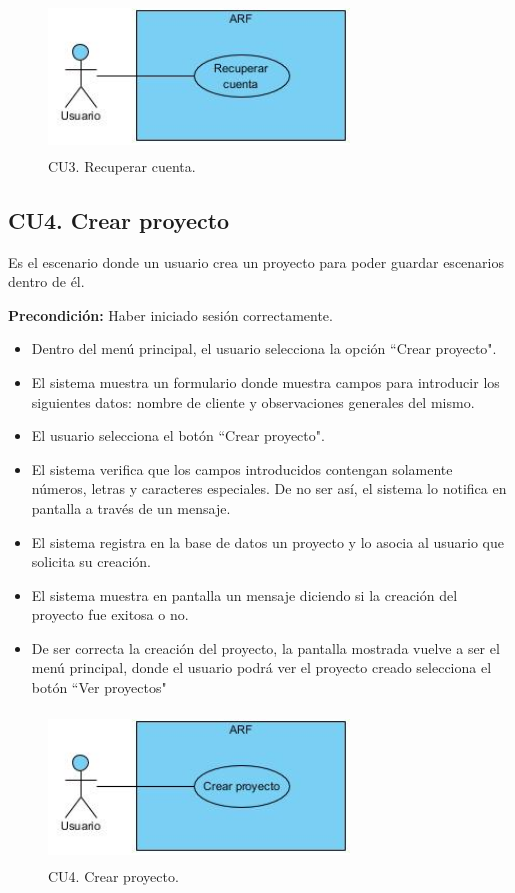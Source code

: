 \begin{figure}[h!]
	\centering
	\includegraphics[width=8cm,height=4cm]{imagenes/analisis/cu/recuperar_cuenta.jpg}
	\caption{CU3. Recuperar cuenta.}
	\label{fig:recuperarcuenta}
\end{figure} 

\subsection{CU4. Crear proyecto}\par
Es el escenario donde un usuario crea un proyecto para poder guardar escenarios dentro de él.\par
\textbf{Precondición:} Haber iniciado sesión correctamente.\par
\begin{itemize}
	\item Dentro del menú principal, el usuario selecciona la opción ``Crear proyecto".
	\item El sistema muestra un formulario donde muestra campos para introducir los siguientes datos: nombre de cliente y observaciones generales del mismo.
	\item El usuario selecciona el botón ``Crear proyecto".
	\item El sistema verifica que los campos introducidos contengan solamente números, letras y caracteres especiales. De no ser así, el sistema lo notifica en pantalla a través de un mensaje.
	\item El sistema registra en la base de datos un proyecto y lo asocia al usuario que solicita su creación.
	\item El sistema muestra en pantalla un mensaje diciendo si la creación del proyecto fue exitosa o no.
	\item De ser correcta la creación del proyecto, la pantalla mostrada vuelve a ser el menú principal, donde el usuario podrá ver el proyecto creado selecciona el botón ``Ver proyectos"
\end{itemize}

\begin{figure}[h!]
	\centering
	\includegraphics[width=8cm,height=4cm]{imagenes/analisis/cu/crear_proyecto.jpg}
	\caption{CU4. Crear proyecto.}
	\label{fig:crearproyecto}
\end{figure} 


